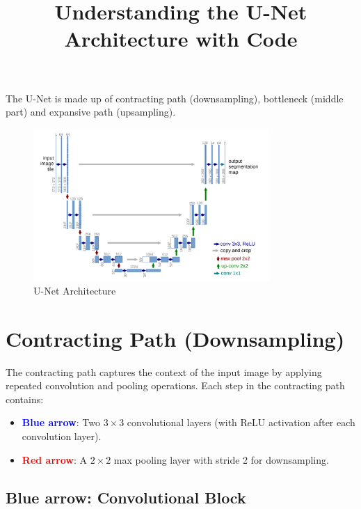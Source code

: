 \documentclass{article}
\title{Understanding the U-Net Architecture with Code}
\author{}
\date{}
\begin{document}
\maketitle

The U-Net is made up of contracting path (downsampling), bottleneck (middle part) and expansive path (upsampling).

\begin{figure}[H]
    \centering
    \includegraphics[width=0.8\textwidth]{unet.png}
    \caption{U-Net Architecture}
    \label{fig:unet}
\end{figure}

\tableofcontents
\newpage

\section{Contracting Path (Downsampling)}

The contracting path captures the context of the input image by applying repeated convolution and pooling operations. Each step in the contracting path contains:

\begin{itemize}
    \item \textbf{\textcolor{blue}{Blue arrow}}: Two $3 \times 3$ convolutional layers (with ReLU activation after each convolution layer).
    \item \textbf{\textcolor{red}{Red arrow}}: A $2 \times 2$ max pooling layer with stride 2 for downsampling.
\end{itemize}





\subsection{Blue arrow: Convolutional Block}
\end{document}
